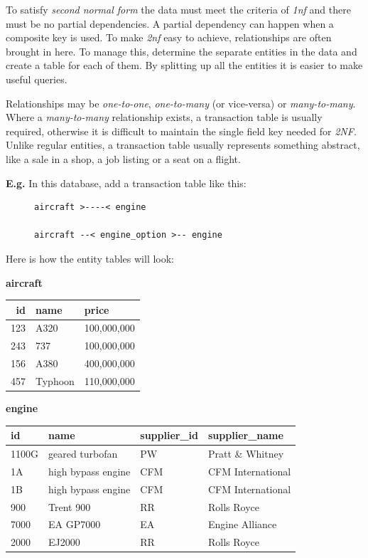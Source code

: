 \documentclass[10pt]{article}
\begin{document}
To satisfy \emph{second normal form} the data must meet  the criteria of \emph{1nf} and there must be no partial dependencies. A partial dependency can happen when a composite key is used. To make \emph{2nf} easy to achieve, relationships are often brought in here. To manage this, determine the separate entities in the data and create a table for each of them. By splitting up all the entities it is easier to make useful queries.

Relationships may be \emph{one-to-one}, \emph{one-to-many} (or vice-versa) or \emph{many-to-many}. Where a \emph{many-to-many} relationship exists, a transaction table is usually required, otherwise it is difficult to maintain the single field key needed for \emph{2NF}. Unlike regular entities, a transaction table usually represents something abstract, like a sale in a shop, a job listing or a seat on a flight.

\textbf{E.g.} In this database, add a transaction table like this:

\begin{figure}[H]
\begin{verbatim}
aircraft >----< engine

aircraft --< engine_option >-- engine
\end{verbatim}
\end{figure}

Here is how the entity tables will look:

\textbf{aircraft}

\begin{center}
\begin{tabular}{rll}
\hline
id & name & price\\
\hline
123 & A320 & 100,000,000\\
243 & 737 & 100,000,000\\
156 & A380 & 400,000,000\\
457 & Typhoon & 110,000,000\\
\hline
\end{tabular}
\end{center}

\textbf{engine}

\begin{center}
\begin{tabular}{llll}
\hline
id & name & supplier\_id & supplier\_name\\
\hline
1100G & geared turbofan & PW & Pratt \& Whitney\\
1A & high bypass engine & CFM & CFM International\\
1B & high bypass engine & CFM & CFM International\\
900 & Trent 900 & RR & Rolls Royce\\
7000 & EA GP7000 & EA & Engine Alliance\\
2000 & EJ2000 & RR & Rolls Royce\\
\hline
\end{tabular}
\end{center}
\end{document}
